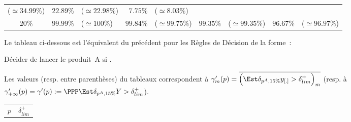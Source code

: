 \documentclass[10pt]{report}
\begin{document}
\begin{exercice}
\begin{center}
\begin{tabular}{|c|rl|rl|rl|rl|}
        ($\simeq34.99\%$)
         & 
    
        $22.89\%$
         & 
    
        ($\simeq22.98\%$)
         & 
    
        $7.75\%$
         & 
    
        ($\simeq8.03\%$)
        
    \\ 

    
        $20\%$
         & 
    
        $99.99\%$
         & 
    
        ($\simeq100\%$)
         & 
    
        $99.84\%$
         & 
    
        ($\simeq99.75\%$)
         & 
    
        $99.35\%$
         & 
    
        ($\simeq99.35\%$)
         & 
    
        $96.67\%$
         & 
    
        ($\simeq96.97\%$)
        
    \\ \cline{1-9}

    \end{tabular}

\end{center}

\noindent Le tableau ci-dessous est l'équivalent du précédent pour les Règles de Décision de la forme~:
\begin{center}
Décider de lancer le produit~A si .
\end{center} 
Les valeurs (resp. entre parenthèses) du tableaux correspondent à $\gamma^\prime_m(p)=\overline{\Big(\Est{\delta_{p^A,15\%}}{y_{[.]}}>\delta^+_{lim}\Big)_m}$ (resp. à $\gamma^\prime_{+\infty}(p)=\gamma^\prime(p):=\PPP{\Est{\delta_{p^A,15\%}}{Y}>\delta^+_{lim}}$).
\begin{center}
\begin{tabular}{|c|rl|rl|rl|rl|}\cline{1-9}
        \multirow{2}{*}{$p$}
         & 
    \multicolumn{8}{c|}{$\delta^+_{lim}$}
    
    
    
    
    
    
    
    \\ \cline{2-9}

    
        

\end{tabular}
\end{center}
\end{exercice}
\end{document}
